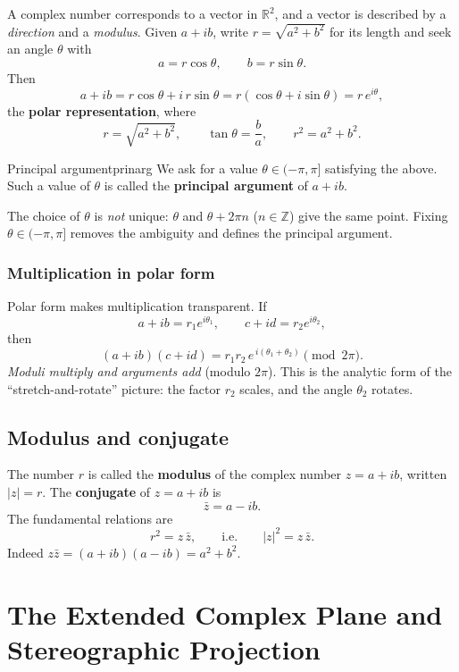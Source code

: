 \documentclass[11pt,openany]{report}
\newcommand{\R}{\mathbb{R}}
\newcommand{\Z}{\mathbb{Z}}
\newcommand{\abs}[1]{\left\lvert #1 \right\rvert}
\begin{document}
A complex number corresponds to a vector in $\R^2$, and a vector is described by a
\emph{direction} and a \emph{modulus}. Given $a+ib$, write $r=\sqrt{a^2+b^2}$ for its
length and seek an angle $\theta$ with
\[
  a = r\cos\theta, \qquad b = r\sin\theta.
\]
Then
\[
  a+ib = r\cos\theta + i\,r\sin\theta = r(\cos\theta+i\sin\theta) = r\,e^{i\theta},
\]
the \textbf{polar representation}, where
\[
  r = \sqrt{a^2+b^2}, \qquad \tan\theta = \frac{b}{a}, \qquad r^2 = a^2+b^2.
\]

\begin{definition}{Principal argument}{prinarg}
We ask for a value $\theta\in(-\pi,\pi]$ satisfying the above. Such a value of $\theta$ is
called the \textbf{principal argument} of $a+ib$.
\end{definition}

\begin{remark}
The choice of $\theta$ is \emph{not} unique: $\theta$ and $\theta+2\pi n$ ($n\in\Z$) give
the same point. Fixing $\theta\in(-\pi,\pi]$ removes the ambiguity and defines the
principal argument.
\end{remark}

\subsection{Multiplication in polar form}

Polar form makes multiplication transparent. If
\[
  a+ib = r_1 e^{i\theta_1}, \qquad c+id = r_2 e^{i\theta_2},
\]
then
\[
  (a+ib)(c+id) = r_1 r_2\, e^{\,i(\theta_1+\theta_2)} \pmod{2\pi}.
\]
\emph{Moduli multiply and arguments add} (modulo $2\pi$). This is the analytic form of the
``stretch-and-rotate'' picture: the factor $r_2$ scales, and the angle $\theta_2$ rotates.

\section{Modulus and conjugate}

The number $r$ is called the \textbf{modulus} of the complex number $z=a+ib$, written
$\abs{z}=r$. The \textbf{conjugate} of $z=a+ib$ is
\[
  \bar z = a-ib.
\]
The fundamental relations are
\[
  r^2 = z\,\bar z, \qquad \text{i.e.}\qquad \abs{z}^2 = z\,\bar z .
\]
Indeed $z\bar z=(a+ib)(a-ib)=a^2+b^2$.


\chapter{The Extended Complex Plane and Stereographic Projection}
\end{document}

